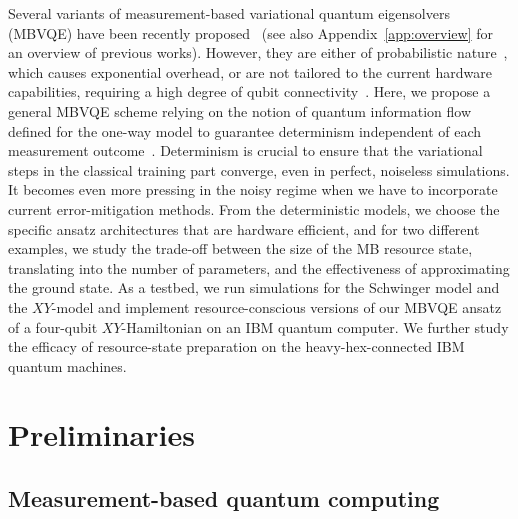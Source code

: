 \documentclass[../main.tex]{subfiles}
\begin{document}
Several variants of measurement-based variational quantum eigensolvers (MBVQE) have been recently proposed~\cite{ferguson2021measurement, proietti2022native, qin2023applicability,chan2023hybrid, marqversen2023applications, majumder2023variational,huang2022near} (see also Appendix~\ref{app:overview} for an overview of previous works). However, they are either of probabilistic nature~\cite{ferguson2021measurement}, which causes exponential overhead, or are not tailored to the current hardware capabilities, requiring a high degree of qubit connectivity~\cite{chan2023hybrid, qin2023applicability}.  Here, we propose a general MBVQE scheme relying on the notion of quantum information flow defined for the one-way model to guarantee determinism independent of each measurement outcome~\cite{browne2007generalized,danos2006determinism}. Determinism is crucial to ensure that the variational steps in the classical training part converge, even in perfect, noiseless simulations. It becomes even more pressing in the noisy regime when we have to incorporate current error-mitigation methods. From the deterministic models, we choose the specific ansatz architectures that are hardware efficient, and for two different examples, we study the trade-off between the size of the MB resource state, translating into the number of parameters, and the effectiveness of approximating the ground state. As a testbed, we run simulations for the Schwinger model and the $XY$-model and implement resource-conscious versions of our MBVQE ansatz of a four-qubit $XY$-Hamiltonian on an IBM quantum computer. We further study the efficacy of resource-state preparation on the heavy-hex-connected IBM quantum machines.

\section{Preliminaries}

\subsection{Measurement-based quantum computing}\label{sec:mbqc}
\end{document}
